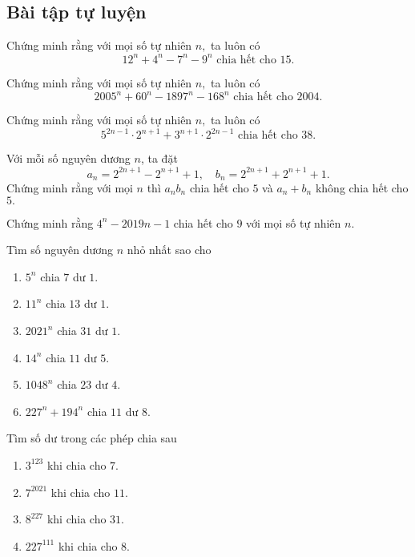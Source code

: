 \subsection*{Bài tập tự luyện}

\begin{btt}
Chứng minh rằng với mọi số tự nhiên $n,$ ta luôn có
\[12^n+4^n-7^n-9^n\text{ chia hết cho } 15.\]
\end{btt}

\begin{btt}
Chứng minh rằng với mọi số tự nhiên $n,$ ta luôn có
\[2005^n+60^n-1897^n-168^n \text{ chia hết cho } 2004.\]
\end{btt}

\begin{btt}
Chứng minh rằng với mọi số tự nhiên $n,$ ta luôn có \[5^{2 n-1} \cdot 2^{n+1}+3^{n+1} \cdot 2^{2 n-1} \text{ chia hết cho } 38.\]
\end{btt}

\begin{btt}
Với mỗi số nguyên dương $n$, ta đặt $$a_{n}=2^{2 n+1}-2^{n+1}+1, \quad b_{n}=2^{2 n+1}+2^{n+1}+1.$$ 
Chứng minh rằng với mọi $n$ thì $a_{n} b_{n}$ chia hết cho $5$ và $a_{n}+b_{n}$ không chia hết cho $5.$
\end{btt}

\begin{btt}
Chứng minh rằng $4^n-2019n-1$ chia hết cho $9$ với mọi số tự nhiên $n.$
\end{btt}

\begin{btt}
Tìm số nguyên dương $n$ nhỏ nhất sao cho
\begin{multicols}{2}
\begin{enumerate}[a,]
    \item $5^n$ chia $7$ dư $1.$
    \item $11^n$ chia $13$ dư $1.$
    \item $2021^n$ chia $31$ dư $1.$
    \item $14^n$ chia $11$ dư $5.$
    \item $1048^n$ chia $23$ dư $4.$
    \item $227^n+194^n$ chia $11$ dư $8.$
\end{enumerate}
\end{multicols}
\end{btt}

\begin{btt}
Tìm số dư trong các phép chia sau
\begin{multicols}{2}
    \begin{enumerate}[a,]
        \item $3^{123}$ khi chia cho $7$.
        \item $7^{2021}$ khi chia cho $11$.
        \item $8^{227}$ khi chia cho $31$.
        \item $227^{111}$ khi chia cho $8$.
    \end{enumerate}
\end{multicols}
\end{btt}

